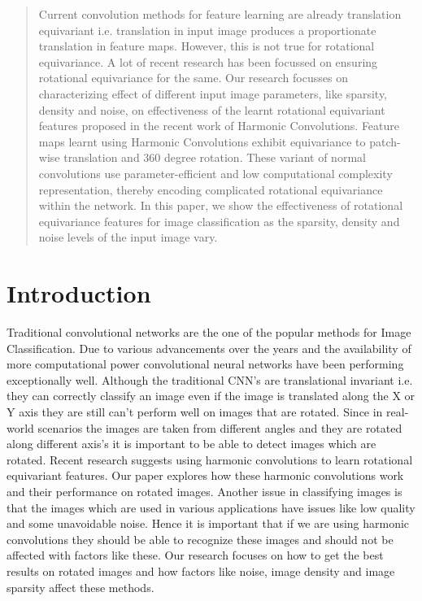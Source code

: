 \documentclass{article}
\begin{document}





\begin{abstract} 
Current convolution methods for feature learning are already translation equivariant i.e. translation in input image produces a proportionate translation in feature maps. However, this is not true for rotational equivariance. A lot of recent research has been focussed on ensuring rotational equivariance for the same. Our research focusses on characterizing effect of different input image parameters, like sparsity, density and noise, on effectiveness of the learnt rotational equivariant features proposed in the recent work of Harmonic Convolutions. Feature maps learnt using Harmonic Convolutions exhibit equivariance to patch-wise translation and 360 degree rotation. These variant of normal convolutions use parameter-efficient and low computational complexity representation, thereby encoding complicated rotational equivariance within the network. In this paper, we show the effectiveness of rotational equivariance features for image classification as the sparsity, density and noise levels of the input image vary.

\end{abstract} 

\section{Introduction}
Traditional convolutional networks are the one of the popular methods for Image Classification. Due to various advancements over the years and the availability of more computational power convolutional neural networks have been performing exceptionally well. Although the traditional CNN’s are translational invariant i.e. they can correctly classify an image even if the image is translated along the X or Y axis they are still can’t perform well on images that are rotated. Since in real-world scenarios the images are taken from different angles and they are rotated along different axis’s it is important to be able to detect images which are rotated. Recent research suggests using harmonic convolutions to learn rotational equivariant features. Our paper explores how these harmonic convolutions work and their performance on rotated images. Another issue in classifying images is that the images which are used in various applications have issues like low quality and some unavoidable noise. Hence it is important that if we are using harmonic convolutions they should be able to recognize these images and should not be affected with factors like these. Our research focuses on how to get the best results on rotated images and how factors like noise, image density and image sparsity affect these methods.
\end{document}
